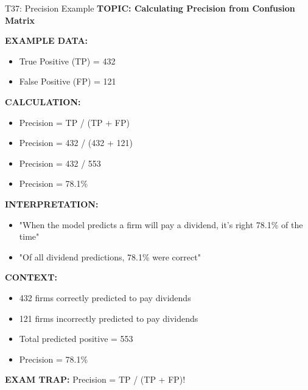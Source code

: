 \documentclass[8pt]{beamer}
\begin{document}
	\begin{frame}{T37: Precision Example}
		\fontsize{6.5}{7.5}\selectfont
		\textbf{TOPIC: Calculating Precision from Confusion Matrix}
		
		\vspace{0.1cm}
		\textbf{EXAMPLE DATA:}
		\begin{itemize}
			\item True Positive (TP) = 432
			\item False Positive (FP) = 121
		\end{itemize}
		
		\vspace{0.1cm}
		\textbf{CALCULATION:}
		\begin{itemize}
			\item Precision = TP / (TP + FP)
			\item Precision = 432 / (432 + 121)
			\item Precision = 432 / 553
			\item Precision = 78.1\%
		\end{itemize}
		
		\vspace{0.1cm}
		\textbf{INTERPRETATION:}
		\begin{itemize}
			\item "When the model predicts a firm will pay a dividend, it's right 78.1\% of the time"
			\item "Of all dividend predictions, 78.1\% were correct"
		\end{itemize}
		
		\vspace{0.1cm}
		\textbf{CONTEXT:}
		\begin{itemize}
			\item 432 firms correctly predicted to pay dividends
			\item 121 firms incorrectly predicted to pay dividends
			\item Total predicted positive = 553
			\item Precision = 78.1\%
		\end{itemize}
		
		\textcolor{myred}{\textbf{EXAM TRAP:}} Precision = \textcolor{myblue}{TP / (TP + FP)}!
	\end{frame}
	
\end{document}
